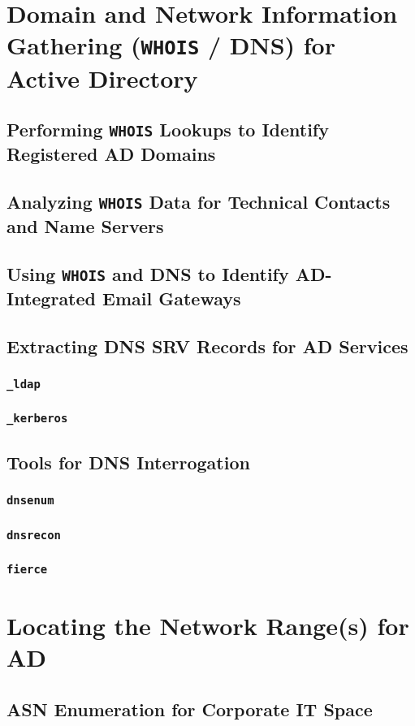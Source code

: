 \documentclass{article}
\begin{document}
\section{Domain and Network Information Gathering (\texttt{WHOIS} / DNS) for Active Directory}
\subsection{Performing \texttt{WHOIS} Lookups to Identify Registered AD Domains}
\subsection{Analyzing \texttt{WHOIS} Data for Technical Contacts and Name Servers}
\subsection{Using \texttt{WHOIS} and DNS to Identify AD-Integrated Email Gateways}
\subsection{Extracting DNS SRV Records for AD Services}
\subsubsection{\texttt{\_ldap} }
\subsubsection{\texttt{\_kerberos}}
\subsection{Tools for DNS Interrogation}
\subsubsection{\texttt{dnsenum}}
\subsubsection{\texttt{dnsrecon}}
\subsubsection{\texttt{fierce}}
\section{Locating the Network Range(s) for AD}
\subsection{ASN Enumeration for Corporate IT Space}
\end{document}
